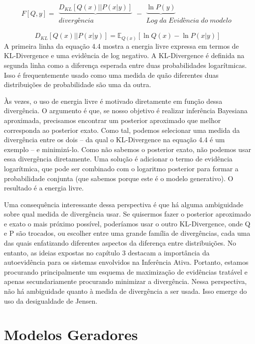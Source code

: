 \documentclass[
  12pt,
]{book}
\begin{document}
\[ F[Q,y] = \begin{matrix} \underbrace {D_{KL}[Q(x) ||P(x|y) ] } \\ divergência \end{matrix} - \begin{matrix} \underbrace {\ln P(y)} \\ Log\;da\;Evidência\;do\;modelo \end{matrix} \]

\[D_{KL}[Q(x) ||P(x|y) ] = \mathbb{E}_{Q(x)}[\ln Q(x)-\ln P(x|y)]\] A
primeira linha da equação 4.4 mostra a energia livre expressa em termos
de KL-Divergence e uma evidência de log negativo. A KL-Divergence é
definida na segunda linha como a diferença esperada entre duas
probabilidades logarítmicas. Isso é frequentemente usado como uma medida
de quão diferentes duas distribuições de probabilidade são uma da outra.

Às vezes, o uso de energia livre é motivado diretamente em função dessa
divergência. O argumento é que, se nosso objetivo é realizar inferência
Bayesiana aproximada, precisamos encontrar um posterior aproximado que
melhor corresponda ao posterior exato. Como tal, podemos selecionar uma
medida da divergência entre os dois -- da qual o KL-Divergence na
equação 4.4 é um exemplo -- e minimizá-lo. Como não sabemos o posterior
exato, não podemos usar essa divergência diretamente. Uma solução é
adicionar o termo de evidência logarítmica, que pode ser combinado com o
logaritmo posterior para formar a probabilidade conjunta (que sabemos
porque este é o modelo generativo). O resultado é a energia livre.

Uma consequência interessante dessa perspectiva é que há alguma
ambiguidade sobre qual medida de divergência usar. Se quisermos fazer o
posterior aproximado e exato o mais próximo possível, poderíamos usar o
outro KL-Divergence, onde Q e P são trocados, ou escolher entre uma
grande família de divergências, cada uma das quais enfatizando
diferentes aspectos da diferença entre distribuições. No entanto, as
ideias expostas no capítulo 3 destacam a importância da autoevidência
para os sistemas envolvidos na Inferência Ativa. Portanto, estamos
procurando principalmente um esquema de maximização de evidências
tratável e apenas secundariamente procurando minimizar a divergência.
Nessa perspectiva, não há ambiguidade quanto à medida de divergência a
ser usada. Isso emerge do uso da desigualdade de Jensen.

\hypertarget{modelos-geradores}{%
\section{Modelos Geradores}\label{modelos-geradores}}
\end{document}
